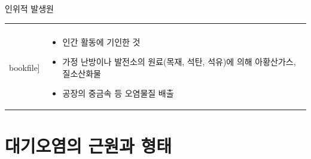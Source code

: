 \begin{frame}[t]{인위적 발생원}
	\begin{tabular}{ll}
		\begin{minipage}[t]{0.5\textwidth}\scriptsize
			\begin{figure}[t]
				\texttt{[image: \\bookfile]}
			\end{figure}
		\end{minipage}	
		&
		\begin{minipage}[t]{0.45\textwidth} \scriptsize	
			\begin{itemize}
				\item 인간 활동에 기인한 것
				\item 가정 난방이나 발전소의 원료(목재, 석탄, 석유)에 의해 아황산가스, 질소산화물
				\item 공장의 중금속 등 오염물질 배출
					
			\end{itemize}

		\end{minipage}
	\end{tabular}
\end{frame}




\section{대기오염의 근원과 형태}

